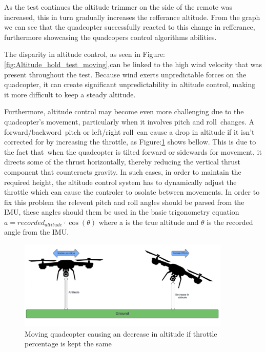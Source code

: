 \documentclass{report}
\begin{document}
As the test continues the altitude trimmer on the side of the remote was
increased, this in turn gradually increases the refferance altitude. From the
graph we can see that the quadcopter successfully reacted to this change in
refferance, furthermore showcasing the quadcopers control algorithms abilities.

The disparity in altitude control, as seen in
Figure:\ref{fig:Altitude_hold_test_moving},can be linked to the high wind
velocity that was present throughout the test. Because wind exerts unpredictable
forces on the quadcopter, it can create significant unpredictability in altitude
control, making it more difficult to keep a steady altitude.

Furthermore, altitude control may become even more challenging due to the
quadcopter's movement, particularly when it involves pitch and roll changes. A
forward/backword pitch or left/right roll can cause a drop in altitude if it
isn't corrected for by increasing the throttle, as
Figure:\ref{fig:ToF_altitude_error} shows bellow. This is due to the fact
that when the quadcopter is tilted forward or sidewards for movement, it directs
some of the thrust horizontally, thereby reducing the vertical thrust component
that counteracts gravity. In such cases, in order to maintain the required
height, the altitude control system has to dynamically adjust the throttle which
can cause the controler to osolate between movements. In order to fix this problem the relevent pitch and roll angles should be parsed from the IMU, these angles should them be used in the basic trigonometry equation \(a = recorded_{altitude} \cdot \cos(\theta)\) where a is the true altitude and \(\theta\) is the recorded angle from the IMU.

\begin{figure}[H]
  \centering
  \includegraphics[width=0.9\textwidth]{Pictures/ToF_altitude_error.png}
  \caption{Moving quadcopter causing an decrease in altitude if throttle percentage is kept the same}
  \label{fig:ToF_altitude_error}
\end{figure}
\end{document}
